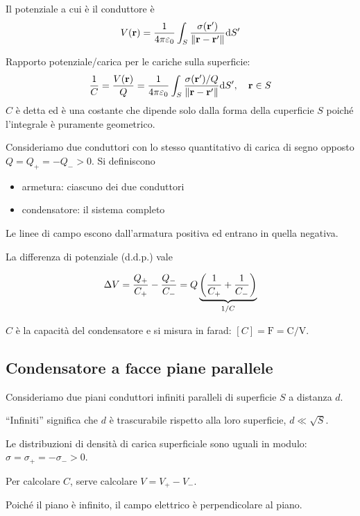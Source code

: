 Il potenziale a cui è il conduttore è
\begin{equation}
    V(\mathbf{r}) = \frac{1}{4\pi \varepsilon_0} \int_S \frac{\sigma(\mathbf{r}')}{\left\lVert \mathbf{r} - \mathbf{r}' \right\rVert} \mathrm{d} S'
\end{equation}

Rapporto potenziale/carica per le cariche sulla superficie:
\begin{equation}
    \frac{1}{C} = \frac{V(\mathbf{r})}{Q} = \frac{1}{4\pi \varepsilon_0} \int_S \frac{\sigma(\mathbf{r}')/Q}{\left\lVert \mathbf{r} - \mathbf{r}' \right\rVert} \mathrm{d} S', \quad \mathbf{r} \in S
\end{equation}
$C$ è detta  ed è una costante che dipende solo dalla forma della cuperficie $S$ poiché l'integrale è puramente geometrico.

Consideriamo due conduttori con lo stesso quantitativo di carica di segno opposto $Q = Q_+ = -Q_- > 0$.
Si definiscono
\begin{itemize}
    \item armetura: ciascuno dei due conduttori
    \item condensatore: il sistema completo
\end{itemize}

Le linee di campo escono dall'armatura positiva ed entrano in quella negativa.

La differenza di potenziale (d.d.p.) vale

\begin{equation}
    \Delta V = \frac{Q_+}{C_+} - \frac{Q_-}{C_-} = Q \underbrace{\left( \frac{1}{C_+} + \frac{1}{C_-} \right)}_{1/C}
\end{equation}

$C$ è la capacità del condensatore e si misura in farad: $[C] = \unit{\farad} = \unit{\coulomb\per\volt}$.

\subsection{Condensatore a facce piane parallele}

Consideriamo due piani conduttori infiniti paralleli di superficie $S$ a distanza $d$.

``Infiniti'' significa che $d$ è trascurabile rispetto alla loro superficie, $d \ll \sqrt{S}$.

Le distribuzioni di densità di carica superficiale sono uguali in modulo: $\sigma = \sigma_+ = -\sigma_- > 0$.

Per calcolare $C$, serve calcolare $V = V_+ - V_-$.

Poiché il piano è infinito, il campo elettrico è perpendicolare al piano.

